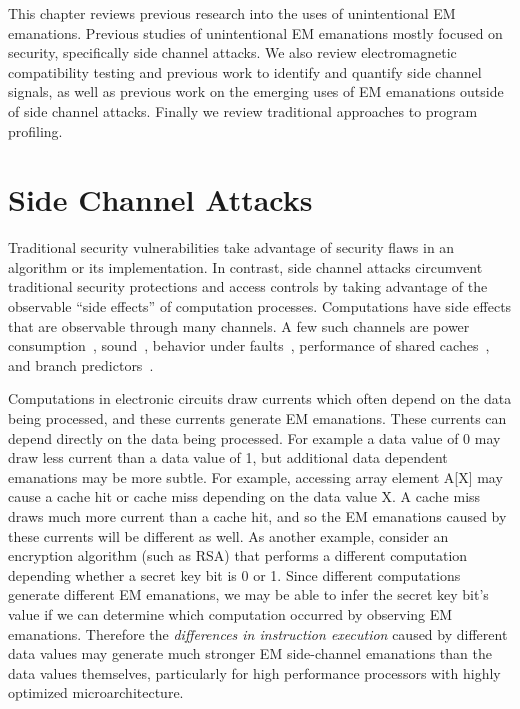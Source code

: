 This chapter reviews previous research into the uses of unintentional EM emanations. Previous studies of unintentional EM emanations mostly focused on security, specifically side channel attacks. We also review electromagnetic compatibility testing and previous work to identify and quantify side channel signals, as well as previous work on the emerging uses of EM emanations outside of side channel attacks. Finally we review traditional approaches to program profiling.

\section{Side Channel Attacks}

Traditional security vulnerabilities take advantage of security flaws in an algorithm or its implementation. In contrast, side channel attacks circumvent traditional security protections and access controls by taking advantage of the observable ``side effects'' of computation processes. Computations have side effects that are observable through many channels. A few such channels are power consumption~\cite{Bayrak11,Goubin99,Kocher99,Messerges99}, sound~\cite{Backes10,Rao02b,ShamirWeb}, behavior under faults~\cite{Biham97,giraud_aes03}, performance of shared caches~\cite{Bangerter11,tsunoo_ita02,Wang07}, and branch predictors~\cite{Aciicmez07}.

Computations in electronic circuits draw currents which often depend on the data being processed, and these currents generate EM emanations. These currents can depend directly on the data being processed. For example a data value of 0 may draw less current than a data value of 1, but additional data dependent emanations may be more subtle. For example, accessing array element A[X] may cause a cache hit or cache miss depending on the data value X. A cache miss draws much more current than a cache hit, and so the EM emanations caused by these currents will be different as well. As another example, consider an encryption algorithm (such as RSA) that performs a different computation depending whether a secret key bit is 0 or 1. Since different computations generate different EM emanations, we may be able to infer the secret key bit's value if we can determine which computation occurred by observing EM emanations. Therefore the \textit{differences in instruction execution} caused by different data values may generate much stronger EM side-channel emanations than the data values themselves, particularly for high performance processors with highly optimized microarchitecture. 

